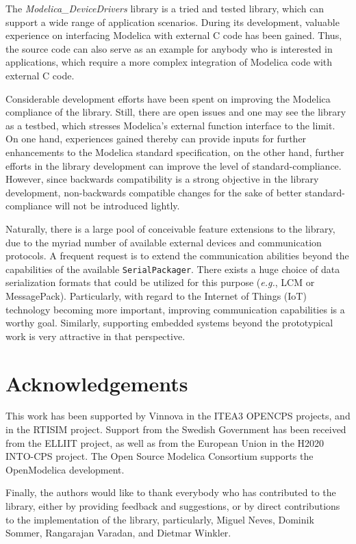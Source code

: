 \documentclass{resources/modelica}
\newcommand{\modelica}[1]{\lstinline[language=modelica]|#1|}
\begin{document}
The \emph{Modelica\_DeviceDrivers} library is a tried and tested library, which
can support a wide range of application scenarios. During its development,
valuable experience on interfacing Modelica with external C code has been
gained. Thus, the source code can also serve as an example for anybody who is
interested in applications, which require a more complex integration of Modelica
code with external C code.

Considerable development efforts have been spent on improving the Modelica
compliance of the library. Still, there are open issues and one may see the
library as a testbed, which stresses Modelica's external function interface
to the limit. On one hand, experiences gained thereby can provide inputs for
further enhancements to the Modelica standard specification, on the other hand,
further efforts in the library development can improve the level of standard-compliance.
However, since backwards compatibility is a strong objective in the library
development, non-backwards compatible changes for the sake of better
standard-compliance will not be introduced lightly.

Naturally, there is a large pool of conceivable feature extensions to the
library, due to the myriad number of available external devices and
communication protocols. A frequent request is to extend the communication
abilities beyond the capabilities of the available \mbox{\modelica{SerialPackager}.}
There exists a huge choice of data serialization formats that could be utilized for this
purpose (\textit{e.g.}, LCM or MessagePack). Particularly, with regard to the Internet of Things (IoT) technology
becoming more important, improving communication capabilities is a worthy goal.
Similarly, supporting embedded systems beyond the prototypical work is very attractive in that perspective.

\section*{Acknowledgements}

This work has been supported by Vinnova in the ITEA3 OPENCPS projects,
and in the RTISIM project.
Support from the Swedish Government has been received from the ELLIIT project,
as well as from the European Union in the H2020 INTO-CPS project.
The Open Source Modelica Consortium supports the OpenModelica development.

Finally, the authors would like to thank everybody who has contributed to the library,
either by providing feedback and suggestions, or by direct contributions to
the implementation of the library, particularly, Miguel Neves, Dominik Sommer,
Rangarajan Varadan, and Dietmar Winkler.



\end{document}
